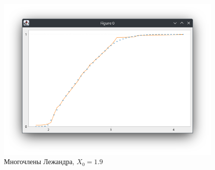 \documentclass[a4paper,14pt]{extarticle}
\begin{document}
    \begin{figure}[h]
        \centering
        \includegraphics[scale=0.5]{images/lege19}
        \caption{Многочлены Лежандра, $X_0 = 1.9$}
    \end{figure}

    \newpage
\end{document}
